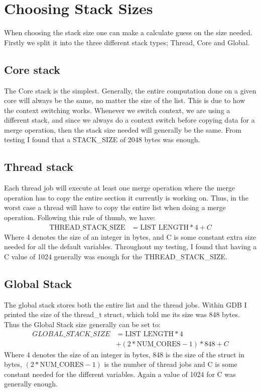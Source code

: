 \section{Choosing Stack Sizes}\label{ap:stack}
When choosing the stack size one can make a calculate guess on the size needed.
Firstly we split it into the three different stack types; Thread, Core and
Global.

\subsection*{Core stack}
The Core stack is the simplest. Generally, the entire computation done on a
given core will always be the same, no matter the size of the list. This is due
to how the context switching works. Whenever we switch context, we are using a
different stack, and since we always do a context switch before copying data for
a merge operation, then the stack size needed will generally be the same. From
testing I found that a STACK\_SIZE of 2048 bytes was enough.

\subsection*{Thread stack}
Each thread job will execute at least one merge operation where the merge
operation has to copy the entire section it currently is working on. Thus, in
the worst case a thread will have to copy the entire list when doing a merge
operation. Following this rule of thumb, we have:
\begin{align}
  \text{THREAD\_STACK\_SIZE} &= \text{LIST LENGTH} * 4 + C
\end{align}
Where 4 denotes the size of an integer in bytes, and C is some constant extra
size needed for all the default variables. Throughout my testing, I found that
having a C value of 1024 generally was enough for the THREAD\_STACK\_SIZE.

\subsection*{Global Stack}
The global stack stores both the entire list and the thread jobs. Within GDB I
printed the size of the thread\_t struct, which told me its size was 848 bytes.
Thus the Global Stack size generally can be set to:
\begin{align}
  GLOBAL\_STACK\_SIZE &= \text{LIST LENGTH} * 4  \\
                      &+ (2 * \text{NUM\_CORES} - 1) * 848  + C
\end{align}
Where 4 denotes the size of an integer in bytes, 848 is the size of the struct
in bytes, $(2 * \text{NUM\_CORES} - 1)$ is the number of thread jobs and C is
some constant needed for the different variables. Again a value of 1024 for C
was generally enough.

